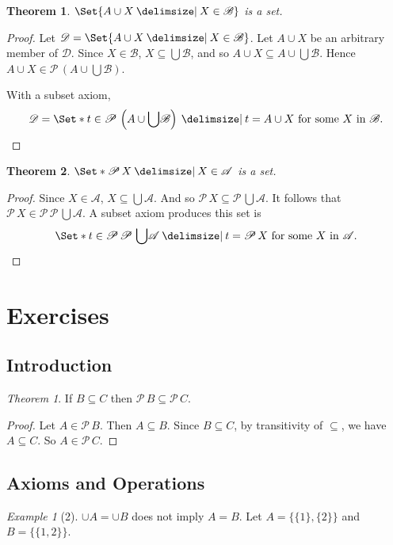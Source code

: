 \documentclass[12pt]{article}
\theoremstyle{plain}
\newtheorem{thm}{Theorem}[section]
\theoremstyle{remark}
\newtheorem*{exthm}{Theorem}
\newtheorem*{eg}{Example}
\theoremstyle{definition}
\theoremstyle{remark}
\newcommand{\powerset}{\mathscr{P}\,}
\providecommand\st{}
\newcommand\SetSymbol[1][]{%
 \nonscript\:#1\vert%
 \allowbreak%
 \nonscript\:
\mathopen{}}
\renewcommand\st{\SetSymbol[\delimsize]}
\begin{document}
\begin{thm}
 $\Set{A \cup X \st X \in \mathscr{B}}$ is a set.
\end{thm}
\begin{proof}
 Let $\mathscr{D} = \Set{A \cup X \st X \in \mathscr{B}}$. Let $A \cup X$ be an arbitrary member of $\mathscr{D}$. Since $X \in \mathscr{B}$, $X \subseteq \bigcup\!\mathscr{B}$, and so $A \cup X \subseteq A \cup \bigcup\!\mathscr{B}$. Hence $A \cup X \in \powerset\left(A \cup \bigcup\!\mathscr{B}\right)$.

 With a subset axiom,
 \[
  \mathscr{D} = \Set*{t \in \powerset\left(A \cup \bigcup\!\mathscr{B}\right) \st t = A \cup X \ \text{for some $X$ in $\mathscr{B}$}}.
 \]
\end{proof}

\begin{thm}
 $\Set*{\powerset X \st X \in \mathscr{A}}$ is a set.
\end{thm}
\begin{proof}
 Since $X \in \mathscr{A}$, $X \subseteq \bigcup\!\mathscr{A}$. And so $\powerset X \subseteq \powerset \bigcup\!\mathscr{A}$. It follows that $\powerset X \in \powerset \powerset \bigcup\!\mathscr{A}$. A subset axiom produces this set is
 \[
  \Set*{t \in \powerset \powerset \bigcup\!\mathscr{A} \st t = \powerset X\ \text{for some $X$ in $\mathscr{A}$}}.
 \]
\end{proof}

\section{Exercises}
\subsection{Introduction}

\begin{exthm}
 If $B \subseteq C$ then $\powerset B \subseteq \powerset C$.
\end{exthm}
\begin{proof}
 Let $A \in \powerset B$. Then $A \subseteq B$. Since $B \subseteq C$, by transitivity of $\subseteq$, we have $A \subseteq C$. So $A \in \powerset C$.
\end{proof}


\subsection{Axioms and Operations}

\begin{eg}[2]
 $\cup A = \cup B$ does not imply $A = B$.
 Let $A = \{\{1\}, \{2\}\}$ and $B = \{\{1, 2\}\}$.
\end{eg}
\end{document}
